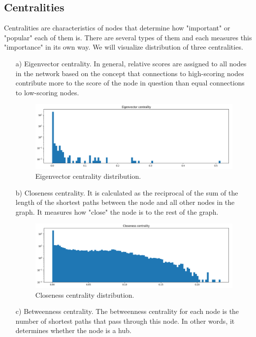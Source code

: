 \documentclass{article}
\newcommand\tab[1][1cm]{\hspace*{#1}}
\begin{document}
\subsection{Centralities}
\tab Centralities are characteristics of nodes that determine how "important" or "popular" each of them is. There are several types of them and each measures this "importance" in its own way. We will visualize distribution of three centralities.
\begin{itemize}
\item[a)] Eigenvector centrality. In general, relative scores are assigned to all nodes in the network based on the concept that connections to high-scoring nodes contribute more to the score of the node in question than equal connections to low-scoring nodes.
\begin{figure}[h]
\centering
\includegraphics[width=1\linewidth]{centralities_eigenvector.png}
\caption{Eigenvector centrality distribution.} \label{plot:centrality:eigenvector}
\end{figure}
\item[b)] Closeness centrality. It is calculated as the reciprocal of the sum of the length of the shortest paths between the node and all other nodes in the graph. It measures how "close" the node is to the rest of the graph.
\begin{figure}[h]
\centering
\includegraphics[width=1\linewidth]{centralities_closeness.png}
\caption{Closeness centrality distribution.} \label{plot:centrality:closeness}
\end{figure}
\item[c)] Betweenness centrality. The betweenness centrality for each node is the number of shortest paths that pass through this node. In other words, it determines whether the node is a hub.

\end{itemize}
\end{document}
